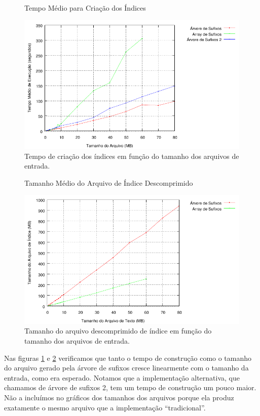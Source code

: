 \documentclass[]{article}
\begin{document}
\begin{figure}
	{\centering Tempo Médio para Criação dos Índices\par}
	\includegraphics{images/index_criacao}
\caption{Tempo de criação dos índices em função do tamanho dos arquivos de entrada.}
\label{fig:e9}
\end{figure}

\begin{figure}
	{\centering Tamanho Médio do Arquivo de Índice Descomprimido\par}
	\includegraphics{images/index_tamanho}
\caption{Tamanho do arquivo descomprimido de índice em função do tamanho dos arquivos de entrada.}
\label{fig:e10}
\end{figure}


Nas figuras \ref{fig:e9} e \ref{fig:e10} verificamos que tanto o tempo de construção como o tamanho do arquivo gerado pela árvore de sufixos cresce linearmente com o tamanho da entrada, como era esperado. Notamos que a implementação alternativa, que chamamos de árvore de sufixos 2, tem um tempo de construção um pouco maior. Não a incluímos no gráficos dos tamanhos dos arquivos porque ela produz exatamente o mesmo arquivo que a implementação ``tradicional''.
\end{document}
